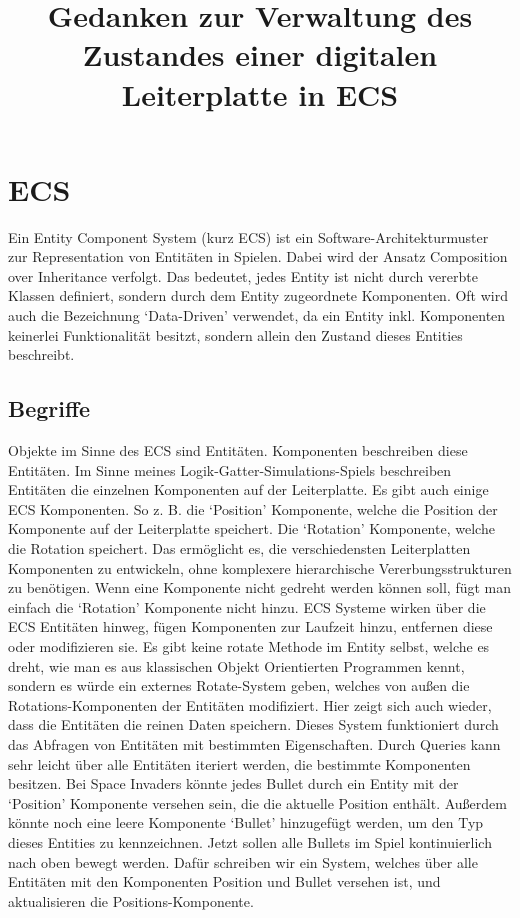 \documentclass{article}
\title{Gedanken zur Verwaltung des Zustandes einer digitalen Leiterplatte in ECS}
\begin{document}
    \section{ECS}
    Ein Entity Component System (kurz ECS) ist ein Software-Architekturmuster zur
    Representation von Entitäten in Spielen.
    Dabei wird der Ansatz Composition over Inheritance verfolgt.
    Das bedeutet, jedes Entity ist nicht durch vererbte Klassen definiert,
    sondern durch dem Entity zugeordnete Komponenten.
    Oft wird auch die Bezeichnung `Data-Driven' verwendet, da ein Entity inkl. Komponenten
    keinerlei Funktionalität besitzt, sondern allein den Zustand dieses Entities beschreibt.

    \subsection{Begriffe}
    Objekte im Sinne des ECS sind Entitäten.
    Komponenten beschreiben diese Entitäten.
    Im Sinne meines Logik-Gatter-Simulations-Spiels beschreiben Entitäten die einzelnen Komponenten
    auf der Leiterplatte.
    Es gibt auch einige ECS Komponenten.
    So z. B. die `Position' Komponente, welche die Position der Komponente auf der Leiterplatte speichert.
    Die `Rotation' Komponente, welche die Rotation speichert.
    Das ermöglicht es, die verschiedensten Leiterplatten Komponenten zu entwickeln, ohne komplexere hierarchische
    Vererbungsstrukturen zu benötigen.
    Wenn eine Komponente nicht gedreht werden können soll, fügt man einfach die `Rotation' Komponente nicht hinzu.
    ECS Systeme wirken über die ECS Entitäten hinweg, fügen Komponenten zur Laufzeit hinzu, entfernen diese oder modifizieren sie.
    Es gibt keine rotate Methode im Entity selbst, welche es dreht, wie man es aus klassischen Objekt Orientierten Programmen
    kennt, sondern es würde ein externes Rotate-System geben, welches von außen die Rotations-Komponenten der Entitäten modifiziert.
    Hier zeigt sich auch wieder, dass die Entitäten die reinen Daten speichern.
    Dieses System funktioniert durch das Abfragen von Entitäten mit bestimmten Eigenschaften.
    Durch Queries kann sehr leicht über
    alle Entitäten iteriert werden, die bestimmte Komponenten besitzen.
    Bei Space Invaders könnte jedes Bullet durch ein Entity mit der `Position' Komponente versehen sein, die die aktuelle Position enthält.
    Außerdem könnte noch eine leere Komponente `Bullet' hinzugefügt werden, um den Typ dieses Entities zu kennzeichnen.
    Jetzt sollen alle Bullets im Spiel kontinuierlich nach oben bewegt werden.
    Dafür schreiben wir ein System, welches über alle Entitäten
    mit den Komponenten Position und Bullet versehen ist, und aktualisieren die Positions-Komponente.
\end{document}
